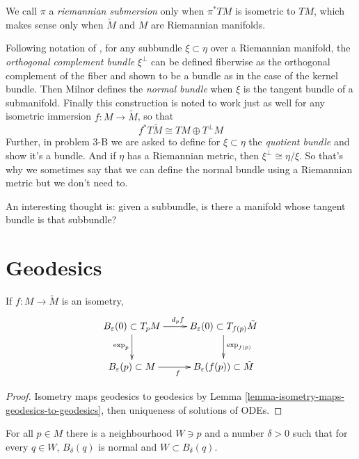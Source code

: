 We call $\pi$ a {\it riemannian submersion} only when $\pi^*TM$ is isometric to
$TM$, which makes sense only when $\tilde{M}$ and $M$ are Riemannian manifolds.

Following notation of \cite{Milnor-Characteristic-Classes}, for any subbundle
$\xi \subset\eta$ over a Riemannian manifold, the {\it orthogonal complement
bundle} $\xi^\perp$ can be defined fiberwise as the orthogonal complement of the
fiber and shown to be a bundle as in the case of the kernel bundle. Then Milnor
defines the {\it normal bundle} when $\xi$ is the tangent bundle of a
submanifold. Finally this construction is noted to work just as well for any
isometric immersion $f:M\to \tilde{M}$, so that
\begin{equation}
\label{equation-immersion-bundle-decomposition}
f^*T\tilde{M}\cong TM\oplus T^\perp M
\end{equation}
Further, in problem 3-B we are asked to define for $\xi \subset \eta$ the {\it
quotient bundle} and show it's a bundle. And if $\eta$ has a Riemannian metric,
then $\xi^\perp\cong\eta/\xi$. So that's why we sometimes say that we can define
the normal bundle using a Riemannian metric but we don't need to.

An interesting thought is: given a subbundle, is there a manifold whose tangent
bundle is that subbundle?

\section{Geodesics}
\label{section-geodesics}

\begin{proposition}
\label{proposition-naturallity-of-exponential}
If $f:M\to \tilde{M}$ is an isometry,
$$
\xymatrix{
B_\varepsilon(0)\subset T_pM \ar[r]^{d_p f} \ar[d]_{\text{exp}_p} &
B_\varepsilon(0)\subset T_{f(p)}\tilde{M} \ar[d]^{\text{exp}_{f(p)}} \\
B_\varepsilon(p)\subset M \ar[r]_{f} & B_\varepsilon(f(p))\subset \tilde{M}
}
$$
\end{proposition}

\begin{proof}
Isometry maps geodesics to geodesics by Lemma 
\ref{lemma-isometry-maps-geodesics-to-geodesics}, then uniqueness of solutions
of ODEs.
\end{proof}

\begin{proposition}
\label{proposition-totally-normal-neighbourhoods}
For all $p \in M$ there is a neighbourhood $W \ni p$ and a number $\delta>0$ 
 such that for every $q \in W$, $B_\delta(q)$ is normal and
 $W \subset B_\delta(q)$. 
\end{proposition}

